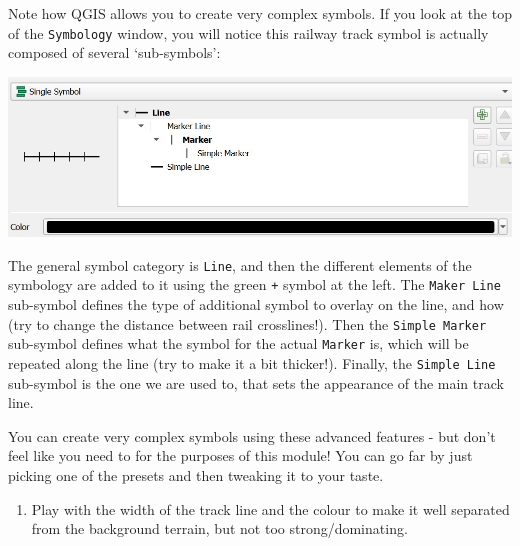 \documentclass[
  letterpaper,
  DIV=11,
  numbers=noendperiod]{scrreprt}
\providecommand{\tightlist}{%
  \setlength{\itemsep}{0pt}\setlength{\parskip}{0pt}}\usepackage{longtable,booktabs,array}
\begin{document}
\begin{tcolorbox}[enhanced jigsaw, coltitle=black, toprule=.15mm, breakable, opacitybacktitle=0.6, left=2mm, colback=white, leftrule=.75mm, rightrule=.15mm, colbacktitle=quarto-callout-tip-color!10!white, toptitle=1mm, titlerule=0mm, colframe=quarto-callout-tip-color-frame, arc=.35mm, bottomtitle=1mm, opacityback=0, bottomrule=.15mm, title=\textcolor{quarto-callout-tip-color}{\faLightbulb}\hspace{0.5em}{Tip}]

Note how QGIS allows you to create very complex symbols. If you look at
the top of the \texttt{Symbology} window, you will notice this railway
track symbol is actually composed of several `sub-symbols':

\includegraphics{images/lab_7/lab7_fig9_track.jpg}

The general symbol category is \texttt{Line}, and then the different
elements of the symbology are added to it using the green \texttt{+}
symbol at the left. The \texttt{Maker\ Line} sub-symbol defines the type
of additional symbol to overlay on the line, and how (try to change the
distance between rail crosslines!). Then the \texttt{Simple\ Marker}
sub-symbol defines what the symbol for the actual \texttt{Marker} is,
which will be repeated along the line (try to make it a bit thicker!).
Finally, the \texttt{Simple\ Line} sub-symbol is the one we are used to,
that sets the appearance of the main track line.

You can create very complex symbols using these advanced features - but
don't feel like you need to for the purposes of this module! You can go
far by just picking one of the presets and then tweaking it to your
taste.

\end{tcolorbox}

\begin{enumerate}
\def\labelenumi{(\arabic{enumi})}
\setcounter{enumi}{206}
\tightlist
\item
  Play with the width of the track line and the colour to make it well
  separated from the background terrain, but not too strong/dominating.
\end{enumerate}
\end{document}
